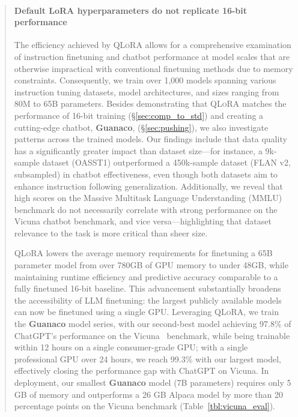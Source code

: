 \begin{quote}
\paragraph{Default LoRA hyperparameters do not replicate 16-bit performance}

The efficiency achieved by \textsc{QLoRA} allows for a comprehensive examination of instruction finetuning and chatbot performance at model scales that are otherwise impractical with conventional finetuning methods due to memory constraints. Consequently, we train over 1,000 models spanning various instruction tuning datasets, model architectures, and sizes ranging from 80M to 65B parameters. Besides demonstrating that \textsc{QLoRA} matches the performance of 16-bit training (\S\ref{sec:comp_to_std}) and creating a cutting-edge chatbot, \textbf{Guanaco}, (\S\ref{sec:pushing}), we also investigate patterns across the trained models. Our findings include that data quality has a significantly greater impact than dataset size—for instance, a 9k-sample dataset (OASST1) outperformed a 450k-sample dataset (FLAN v2, subsampled) in chatbot effectiveness, even though both datasets aim to enhance instruction following generalization. Additionally, we reveal that high scores on the Massive Multitask Language Understanding (MMLU) benchmark do not necessarily correlate with strong performance on the Vicuna chatbot benchmark, and vice versa—highlighting that dataset relevance to the task is more critical than sheer size.

\textsc{QLoRA} lowers the average memory requirements for finetuning a 65B parameter model from over 780GB of GPU memory to under 48GB, while maintaining runtime efficiency and predictive accuracy comparable to a fully finetuned 16-bit baseline. This advancement substantially broadens the accessibility of LLM finetuning: the largest publicly available models can now be finetuned using a single GPU. Leveraging \textsc{QLoRA}, we train the \textbf{Guanaco} model series, with our second-best model achieving 97.8\% of ChatGPT's performance on the Vicuna~\citep{vicuna2023} benchmark, while being trainable within 12 hours on a single consumer-grade GPU; with a single professional GPU over 24 hours, we reach 99.3\% with our largest model, effectively closing the performance gap with ChatGPT on Vicuna. In deployment, our smallest \textbf{Guanaco} model (7B parameters) requires only 5 GB of memory and outperforms a 26 GB Alpaca model by more than 20 percentage points on the Vicuna benchmark (Table~\ref{tbl:vicuna_eval}).


\end{quote}
